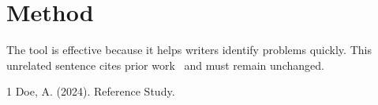 \documentclass{article}
\begin{document}
\section{Method}\label{sec:method}
The tool is effective because it helps writers identify problems quickly.
This unrelated sentence cites prior work~\cite{doe2024} and must remain unchanged.
\begin{thebibliography}{1}
 Doe, A. (2024). Reference Study.
\end{thebibliography}
\end{document}
